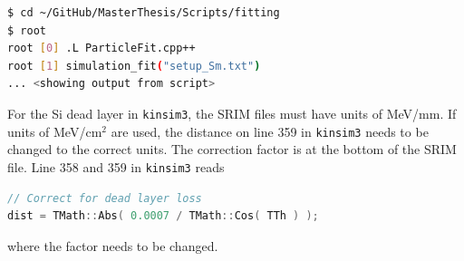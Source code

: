 \documentclass[twoside,english]{uiofysmaster/uiofysmaster}
\begin{document}
\begin{appendices}
\begin{lstlisting}[language=sh]
$ cd ~/GitHub/MasterThesis/Scripts/fitting
$ root
root [0] .L ParticleFit.cpp++
root [1] simulation_fit("setup_Sm.txt")
... <showing output from script>
\end{lstlisting}

For the Si dead layer in \texttt{kinsim3}, the SRIM files must have units of MeV/mm. 
If units of MeV/cm$^2$ are used, the distance on line 359 in \texttt{kinsim3} needs to be changed to the correct units. 
The correction factor is at the bottom of the SRIM file.
Line 358 and 359 in \texttt{kinsim3} reads
\begin{lstlisting}[language=c++]
// Correct for dead layer loss
dist = TMath::Abs( 0.0007 / TMath::Cos( TTh ) );
\end{lstlisting}
where the factor needs to be changed.







\end{appendices}


%


\end{document}
